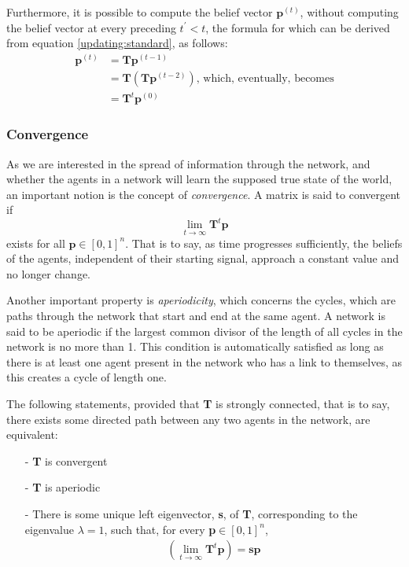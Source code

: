 \documentclass{article}
\begin{document}
Furthermore, it is possible to compute the belief vector $\textbf{p}^{(t)}$, without computing the belief vector at every preceding $t^\prime < t$, the formula for which can be derived from equation \ref{updating:standard}, as follows:
\begin{align*}
    \textbf{p}^{(t)} &= \textbf{T}\textbf{p}^{(t-1)} \\
    &= \textbf{T}(\textbf{T}\textbf{p}^{(t-2)}) \text{, which, eventually, becomes}\\
    &= \textbf{T}^{t}\textbf{p}^{(0)}
\end{align*}

\newpage

\subsubsection{Convergence}
As we are interested in the spread of information through the network, and whether the agents in a network will learn the supposed true state of the world, an important notion is the concept of \emph{convergence}. A matrix  is said to convergent if
\begin{equation*}
    \lim_{t\to\infty} \textbf{T}^t\textbf{p}
\end{equation*}
exists for all $\textbf{p} \in [0, 1]^n$. That is to say, as time progresses sufficiently, the beliefs of the agents, independent of their starting signal, approach a constant value and no longer change.

Another important property is \emph{aperiodicity}, which concerns the cycles, which are paths through the network that start and end at the same agent. A network is said to be aperiodic if the largest common divisor of the length of all cycles in the network is no more than 1. This condition is automatically satisfied as long as there is at least one agent present in the network who has a link to themselves, as this creates a cycle of length one.

The following statements, provided that \textbf{T} is strongly connected, that is to say, there exists some directed path between any two agents in the network,  are equivalent:
\begin{itemize}
    \item[-] \textbf{T} is convergent
    \item[-] \textbf{T} is aperiodic
    \item[-] There is some unique left eigenvector, \textbf{s}, of \textbf{T}, corresponding to the eigenvalue $\lambda=1$, such that, for every \textbf{p}$\in [0,1]^n$,
    \begin{align*}
        (\lim_{t\to\infty}\textbf{T}^t\textbf{p}) = \textbf{sp}
    \end{align*}
\end{itemize}

\newpage




\end{document}
